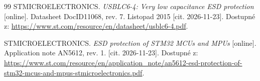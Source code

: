 \begin{thebibliography}{99}
    STMICROELECTRONICS.
    \emph{USBLC6-4: Very low capacitance ESD
    protection} [online].
    Datasheet DocID11068, rev. 7.
    Listopad 2015
    [cit. 2026-11-23].
    Dostupné z:
    \url{https://www.st.com/resource/en/datasheet/usblc6-4.pdf}.

    STMICROELECTRONICS.
    \emph{ESD protection of STM32 MCUs and MPUs}
    [online].
    Application note AN5612, rev. 1.
    [cit. 2026-11-23].
    Dostupné z:
    \url{https://www.st.com/resource/en/application_note/an5612-esd-protection-of-stm32-mcus-and-mpus-stmicroelectronics.pdf}.

\end{thebibliography}


%
%


